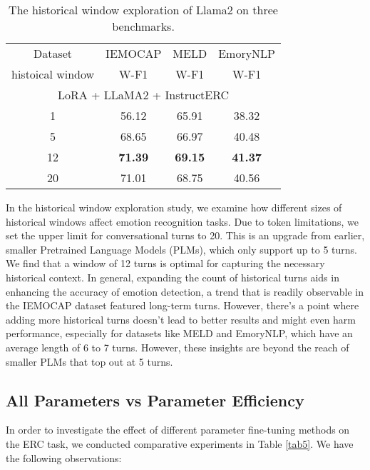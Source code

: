 \documentclass[conference]{IEEEtran}
\begin{document}
\begin{table}[htbp]
\centering
\caption{The historical window exploration of Llama2 on three benchmarks.}
\begin{tabular}{cccc}
\toprule
 Dataset          & IEMOCAP                    & MELD                       & EmoryNLP        \\ 
histoical window                  & {W-F1}       & {W-F1}       & {W-F1} \\ 
\midrule
\multicolumn{4}{c}{LoRA + LLaMA2  + InstructERC}       \\
\midrule 
1             & 56.12 & {65.91} & {38.32}  \\
5 & 68.65 & 66.97 & 40.48 \\
12 & \textbf{71.39} & \textbf{69.15} & \textbf{41.37}  \\
20 & 71.01 & 68.75 & 40.56 \\
\bottomrule
\end{tabular}


\vspace{-0.2cm}
\label{tab4}
\end{table}


In the historical window exploration study, we examine how different sizes of historical windows affect emotion recognition tasks. Due to token limitations, we set the upper limit for conversational turns to 20. This is an upgrade from earlier, smaller Pretrained Language Models (PLMs), which only support up to 5 turns. We find that a window of 12 turns is optimal for capturing the necessary historical context. In general, expanding the count of historical turns aids in enhancing the accuracy of emotion detection, a trend that is readily observable in the IEMOCAP dataset featured long-term turns. However, there's a point where adding more historical turns doesn't lead to better results and might even harm performance, especially for datasets like MELD and EmoryNLP, which have an average length of 6 to 7 turns. However, these insights are beyond the reach of smaller PLMs that top out at 5 turns.


\subsection{All Parameters vs Parameter Efficiency }










In order to investigate the effect of different parameter fine-tuning methods on the ERC task, we conducted comparative experiments in Table \ref{tab5}. We have the following observations:
\end{document}
